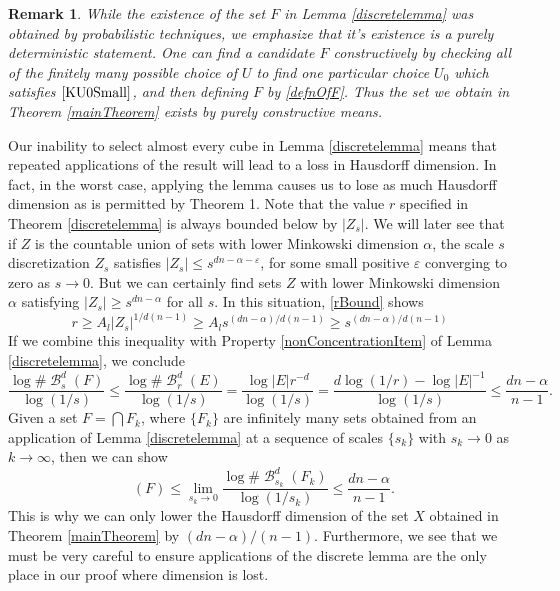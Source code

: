 \documentclass[dvipsnames,letterpaper,12pt]{article}
\numberwithin{equation}{section}
\theoremstyle{plain}
\newtheorem*{remark}{Remark}
\DeclareMathOperator{\hausdim}{\dim_{\mathbf{H}}}
\DeclareMathOperator{\B}{\mathcal{B}}
\begin{document}
\begin{remark}
	While the existence of the set $F$ in Lemma \ref{discretelemma} was obtained by probabilistic techniques, we emphasize that it's existence is a purely deterministic statement. One can find a candidate $F$ constructively by checking all of the finitely many possible choice of $U$ to find one particular choice $U_0$ which satisfies $\eqref{KU0Small}$, and then defining $F$ by \eqref{defnOfF}.
	Thus the set we obtain in Theorem \ref{mainTheorem} exists by purely constructive means.
\end{remark}

Our inability to select almost every cube in Lemma \ref{discretelemma} means that repeated applications of the result will lead to a loss in Hausdorff dimension. In fact, in the worst case, applying the lemma causes us to lose as much Hausdorff dimension as is permitted by Theorem 1. Note that the value $r$ specified in Theorem \ref{discretelemma} is always bounded below by $|Z_s|$. We will later see that if $Z$ is the countable union of sets with lower Minkowski dimension $\alpha$, the scale $s$ discretization $Z_s$ satisfies $|Z_s| \leq s^{dn - \alpha - \varepsilon}$, for some small positive $\varepsilon$ converging to zero as $s \to 0$. But we can certainly find sets $Z$ with lower Minkowski dimension $\alpha$ satisfying $|Z_s| \geq s^{dn - \alpha}$ for all $s$. In this situation, \eqref{rBound} shows
%
\begin{equation} \label{rWorstCase}
	r \geq A_l |Z_s|^{1/d(n-1)} \geq A_l s^{(dn - \alpha)/d(n-1)} \geq s^{(dn - \alpha)/d(n-1)}
\end{equation}
%
If we combine this inequality with Property \ref{nonConcentrationItem} of Lemma \ref{discretelemma}, we conclude
%
\[	\frac{\log \# \B^d_s(F)}{\log(1/s)} \leq \frac{\log \# \B^d_r(E)}{\log(1/s)} = \frac{\log |E| r^{-d}}{\log(1/s)} = \frac{d \log(1/r) - \log |E|^{-1}}{\log(1/s)} \leq \frac{dn - \alpha}{n - 1}. \]
%
Given a set $F = \bigcap F_k$, where $\{ F_k \}$ are infinitely many sets obtained from an application of Lemma \ref{discretelemma} at a sequence of scales $\{ s_k \}$ with $s_k \to 0$ as $k \to \infty$, then we can show%
%
\[	\hausdim(F) \leq \lim_{s_k \to 0} \frac{\log \# \B^d_{s_k}(F_k)}{\log(1/s_k)} \leq \frac{dn - \alpha}{n-1}. \]
%
This is why we can only lower the Hausdorff dimension of the set $X$ obtained in Theorem \ref{mainTheorem} by $(dn - \alpha)/(n-1)$. Furthermore, we see that we must be very careful to ensure applications of the discrete lemma are the only place in our proof where dimension is lost.
\end{document}
